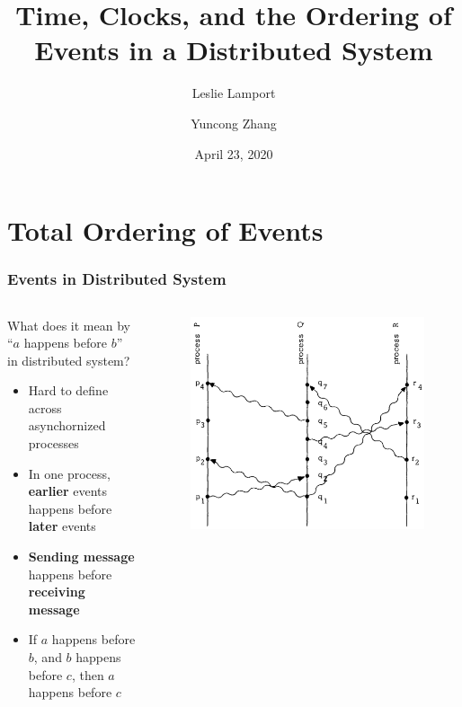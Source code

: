 \documentclass{beamer}
\title{Time, Clocks, and the Ordering of Events in a Distributed System}
\subtitle{Leslie Lamport}
\author{Yuncong Zhang}
\date{April 23, 2020}
\begin{document}
\frame{\titlepage}


\section{Total Ordering of Events}

\frame
{
  \frametitle{Events in Distributed System}
	\begin{columns}
	\begin{column}{0.6\textwidth}

		\onslide<+-> What does it mean by ``$a$ happens before $b$'' in distributed system?

		\begin{itemize}
			\item<+-> Hard to define across asynchornized processes
			\item<+-> In one process, \textbf{earlier} events happens before \textbf{later} events
			\item<+-> \textbf{Sending message} happens before \textbf{receiving message}
			\item<+-> If $a$ happens before $b$, and $b$ happens before $c$, then $a$ happens before $c$
		\end{itemize}

	\end{column}
	\begin{column}{0.4\textwidth}

		\begin{figure}[ht!]
		\includegraphics[width=\textwidth]{files/events-messages.png}
		\end{figure}


	\end{column}
	\end{columns}
}
\end{document}
